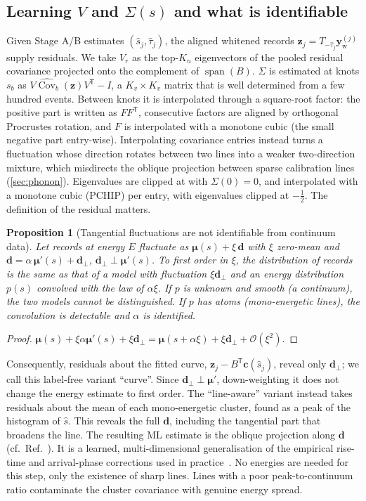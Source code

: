 \documentclass[aps,prapplied,reprint,superscriptaddress,longbibliography,nofootinbib]{revtex4-2}
\newtheorem{proposition}{Proposition}
\theoremstyle{remark}
\newcommand{\T}{\mathsf{T}}
\newcommand{\vect}[1]{\bm{#1}}
\newcommand{\Sh}[1]{T_{#1}}
\newcommand{\yw}{\vect{y}_{\mathrm w}}
\begin{document}
\subsection{Learning $V$ and $\Sigma(s)$ and what is identifiable}
\label{sec:identifiability}
Given Stage A/B estimates $(\hat s_j,\hat\tau_j)$, the aligned whitened records
$\vect z_j=\Sh{-\hat\tau_j}\yw^{(j)}$ supply residuals. We take $V_r$ as the top-$K_n$
eigenvectors of the pooled residual covariance projected onto the complement of
$\operatorname{span}(B)$. $\Sigma$ is estimated at knots $s_b$ as
$V\widehat{\operatorname{Cov}}_b(\vect z)V^\T-I$, a $K_v\times K_v$ matrix that is
well determined from a few hundred events. Between knots it is interpolated through
a square-root factor: the positive part is written as $FF^\T$, consecutive
factors are aligned by orthogonal Procrustes rotation, and $F$ is interpolated
with a monotone cubic (the small negative part entry-wise). Interpolating
covariance entries instead turns a fluctuation whose direction rotates between
two lines into a weaker two-direction mixture, which misdirects the oblique
projection between sparse calibration lines (\cref{sec:phonon}). Eigenvalues are
clipped at with $\Sigma(0)=0$, and
interpolated with a monotone cubic (PCHIP) per entry, with eigenvalues clipped at
$-\frac12$. The definition of the residual matters.

\begin{proposition}[Tangential fluctuations are not identifiable from continuum
data]\label{prop:identifiability}
Let records at energy $E$ fluctuate as $\vect\mu(s)+\xi\,\vect d$ with $\xi$
zero-mean and $\vect d=\alpha\,\vect\mu'(s)+\vect d_\perp$,
$\vect d_\perp\perp\vect\mu'(s)$. To first order in $\xi$, the distribution of
records is the same as that of a model with fluctuation $\xi\vect d_\perp$ and an
energy distribution $p(s)$ convolved with the law of $\alpha\xi$. If $p$ is unknown
and smooth (a continuum), the two models cannot be distinguished. If $p$ has atoms
(mono-energetic lines), the convolution is detectable and $\alpha$ is identified.
\end{proposition}
\begin{proof}
$\vect\mu(s)+\xi\alpha\vect\mu'(s)+\xi\vect d_\perp=\vect\mu(s+\alpha\xi)+\xi\vect
d_\perp+\mathcal O(\xi^2)$.
\end{proof}
Consequently, residuals about the fitted curve, $\vect z_j-B^\T\vect c(\hat s_j)$,
reveal only $\vect d_\perp$; we call this label-free variant ``curve''. Since
$\vect d_\perp\perp\vect\mu'$, down-weighting it does not change the energy
estimate to first order. The ``line-aware'' variant instead takes residuals about
the mean of each mono-energetic cluster, found as a peak of the histogram of
$\hat s$. This reveals the full $\vect d$, including the tangential part that
broadens the line. The resulting ML estimate is the oblique projection along
$\vect d$ (cf.\ Ref.~\cite{Fixsen2014}). It is a learned, multi-dimensional
generalisation of the empirical rise-time and arrival-phase corrections used in
practice~\cite{Fowler2016practice}. No energies are needed for this step, only the
existence of sharp lines. Lines with a poor peak-to-continuum ratio contaminate the
cluster covariance with genuine energy spread.
\end{document}
